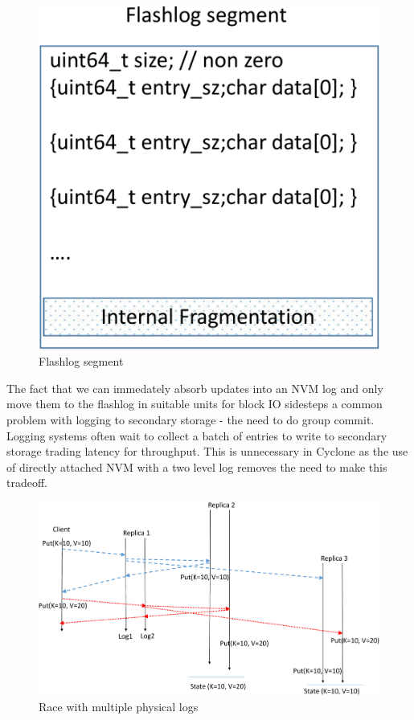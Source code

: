 \documentclass[10pt, preprint, nonatbib]{sigplanconf}
\begin{document}
\begin{figure}
  \centering
  \includegraphics[scale=0.3]{figures2/flashlog_page.pdf}
  \caption{Flashlog segment}
  \label{fig:flashlog_page}
\end{figure}

The fact that we can immedately absorb updates into an NVM log and only move
them to the flashlog in suitable units for block IO sidesteps a common problem
with logging to secondary storage - the need to do group commit. Logging systems
often wait to collect a batch of entries to write to secondary storage trading
latency for throughput. This is unnecessary in Cyclone as the use of directly
attached NVM with a two level log removes the need to make this tradeoff.

\begin{figure}
  \centering
  \includegraphics[scale=0.3]{figures2/race.pdf}
  \caption{Race with multiple physical logs}
  \label{fig:race}
\end{figure}
\end{document}
